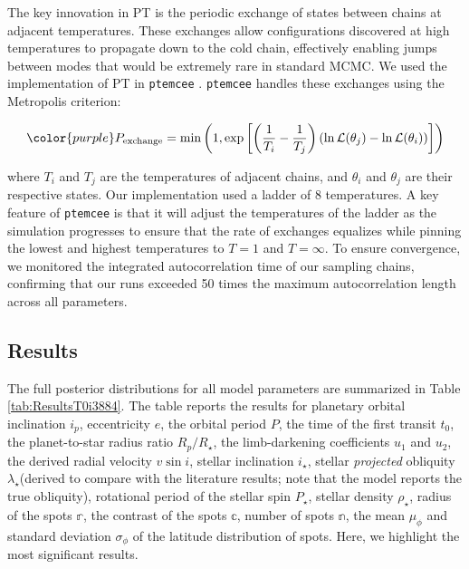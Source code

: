 \documentclass[twocolumn]{aastex631}
\newcommand{\sabinasays}[1]{{\color{purple}#1}}
\begin{document}
The key innovation in PT is the periodic exchange of states between chains at adjacent temperatures. 
These exchanges allow configurations discovered at high temperatures to propagate down to the cold chain, 
effectively enabling jumps between modes that would be extremely rare in standard MCMC. We used the implementation
of PT in \texttt{ptemcee} \citep{ptemcee}. \texttt{ptemcee} handles these exchanges using the Metropolis criterion:

\begin{equation}
    \label{eq:ptemcee}
    \sabinasays{P_{\rm exchange} = \min\left(1, \exp\left[\left(\frac{1}{T_i} - \frac{1}{T_j}\right)\left(\ln \mathcal{L}(\theta_j) - \ln \mathcal{L}(\theta_i)\right)\right]\right)}
\end{equation}

where $T_i$ and $T_j$ are the temperatures of adjacent chains, and $\theta_i$
and $\theta_j$ are their respective states. Our implementation used a ladder of
8 temperatures.  A key feature
of \texttt{ptemcee} is that it will adjust the temperatures of the ladder as the
simulation progresses to ensure that the rate of exchanges equalizes while
pinning the lowest and highest temperatures to $T=1$ and $T=\infty$.
To ensure convergence, we monitored the integrated autocorrelation time of our sampling chains, confirming that our 
runs exceeded 50 times the maximum autocorrelation length across all parameters.

\subsection{Results}

The full posterior distributions for all model parameters are summarized in Table \ref{tab:ResultsT0i3884}. \sabinasays{The table reports the results for planetary orbital inclination $i_p$, eccentricity $e$, the orbital period $P$, the time of the first transit $t_0$, the planet-to-star radius ratio $R_p/R_\star$, the limb-darkening coefficients $u_1$ and $u_2$, the derived radial velocity $v\sin{i}$,  stellar inclination $i_\star$, stellar \textit{projected} obliquity $\lambda_\star$(derived to compare with the literature results; note that the model reports the true obliquity), rotational period of the stellar spin $P_\star$, stellar density $\rho_\star$, radius of the spots $\mathbb{r}$, the contrast of the spots $\mathbb{c}$, number of spots $\mathbb{n}$, the mean $\mu_\phi$ and standard deviation $\sigma_\phi$ of the latitude distribution of spots.} Here, we highlight the 
most significant results. 
\end{document}
